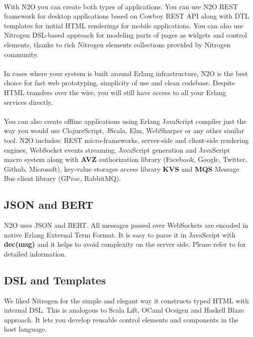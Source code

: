 \paragraph{}
With N2O you can create both types of applications. You can use N2O REST framework
for desktop applications based on Cowboy REST API along with DTL
templates for initial HTML renderings for mobile applications.
You can also use Nitrogen DSL-based approach for modeling parts of pages
as widgets and control elements, thanks to rich
Nitrogen elements collections provided by Nitrogen community.

\paragraph{}
In cases where your system is built around Erlang infrastructure, N2O
is the best choice for fast web prototyping, simplicity
of use and clean codebase. Despite HTML transfers over the wire,
you will still have access to all your Erlang services directly.

\paragraph{}
You can also create offline applications using Erlang JavaScript compiler
just the way you would use ClojureScript, JScala, Elm, WebSharper
or any other similar tool. N2O includes: REST micro-frameworks,
server-side and client-side rendering engines,
WebSocket events streaming, JavaScript generation
and JavaScript macro system along with {\bf AVZ} authorization
library (Facebook, Google, Twitter, Github, Microsoft), key-value storages
access library {\bf KVS} and {\bf MQS} Message Bus client library (GProc, RabbitMQ).

\subsection{JSON and BERT}
N2O uses JSON and BERT. All messages passed over
WebSockets are encoded in native Erlang External Term Format.
It is easy to parse it in JavaScript with {\bf dec(msg)}
and it helps to avoid complexity on the server side. Please refer
to  for detailed information.

\subsection{DSL and Templates}
We liked Nitrogen for the simple and elegant way it constructs typed
HTML with internal DSL. This is analogous to Scala Lift,
OCaml Ocsigen and Haskell Blaze approach. It lets you develop reusable control
elements and components in the host language.


